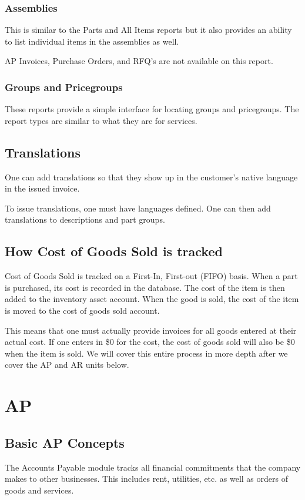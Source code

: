 \documentclass{article}
\begin{document}
\subsubsection{Assemblies}

This is similar to the Parts and All Items reports but it also provides an
ability to list individual items in the assemblies as well.

AP Invoices, Purchase Orders, and RFQ's are not available on this report.

\subsubsection{Groups and Pricegroups}

These reports provide a simple interface for locating groups and pricegroups.
The report types are similar to what they are for services.

\subsection{Translations}
One can add translations so that they show up in the customer's native language
in the issued invoice.

To issue translations, one must have languages defined.  One can then add
translations to descriptions and part groups.

\subsection{How Cost of Goods Sold is tracked}
Cost of Goods Sold is tracked on a First-In, First-out (FIFO) basis.  When a 
part is purchased, its cost is recorded in the database.  The cost of the item 
is then added to the inventory asset account.  When the good is sold, the cost 
of the item is moved to the cost of goods sold account.

This means that one must actually provide invoices for all goods entered at
their actual cost.  If one enters in \$0 for the cost, the cost of goods sold
will also be \$0 when the item is sold.  We will cover this entire process in
more depth after we cover the AP and AR units below.

\section{AP}
\subsection{Basic AP Concepts}
The Accounts Payable module tracks all financial commitments that the company
makes to other businesses.  This includes rent, utilities, etc. as well as
orders of goods and services.
\end{document}
